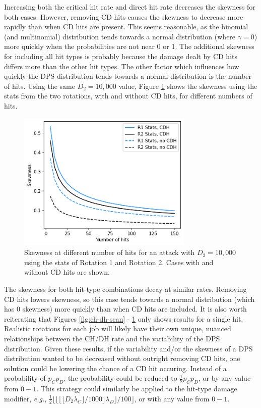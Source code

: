 \documentclass{article}
\begin{document}
        Increasing both the critical hit rate and direct hit rate decreases the skewness for both cases. However, removing CD hits causes the skewness to decrease more rapidly than when CD hits are present. This seems reasonable, as the binomial (and multinomial) distribution tends towards a normal distribution (where $\gamma = 0$) more quickly when the probabilities are not near 0 or 1. The additional skewness for including all hit types is probably because the damage dealt by CD hits differs more than the other hit types. The other factor which influences how quickly the DPS distribution tends towards a normal distribution is the number of hits. Using the same $D_2 = 10,000$ value, Figure \ref{fig:hit-scan} shows the skewness using the stats from the two rotations, with and without CD hits, for different numbers of hits. 
        
        \begin{figure}[H]
            \centering
            \includegraphics[width=3.3in]{img/hit-scan.png}
            \caption{Skewness at different number of hits for an attack with $D_2 = 10,000$ using the stats of Rotation 1 and Rotation 2. Cases with and without CD hits are shown.}\label{fig:hit-scan}
        \end{figure}

        The skewness for both hit-type combinations decay at similar rates. Removing CD hits lowers skewness, so this case tends towards a normal distribution (which has 0 skewness) more quickly than when CD hits are included. It is also worth reiterating that Figures \ref{fig:ch-dh-scan} - \ref{fig:hit-scan} only shows results for a single hit. Realistic rotations for each job will likely have their own unique, nuanced relationships between the CH/DH rate and the variability of the DPS distribution. Given these results, if the variability and/or the skewness of a DPS distribution wanted to be decreased without outright removing CD hits, one solution could be lowering the chance of a CD hit occuring. Instead of a probability of $p_C p_D$, the probability could be reduced to $\frac{1}{2} p_C p_D$, or by any value from $0-1$. This strategy could similarly be applied to the hit-type damage modifier, \textit{e.g.}, $\frac{1}{2}\lfloor \lfloor \lfloor \lfloor D_2 \lambda_C \rfloor / 1000 \rfloor \lambda_D \rfloor / 100 \rfloor$, or with any value from $0-1$.
\end{document}
